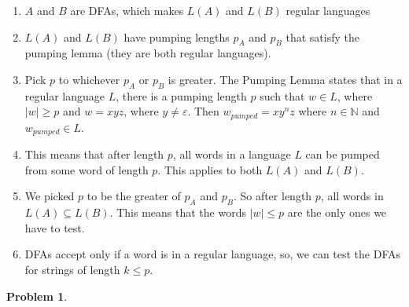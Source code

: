 \documentclass[11pt]{article}
\newcommand{\N}{\mathbb{N}}
\theoremstyle{definition}
\theoremstyle{case}
\theoremstyle{theorem}
\newtheorem{prob}{Problem}
\begin{document}
\begin{enumerate}[label=\arabic*.]

\item $A$ and $B$ are DFAs, which makes $L(A)$ and $L(B)$ regular languages

\item $L(A)$ and $L(B)$ have pumping lengths $p_A$ and $p_B$ that satisfy the pumping lemma
(they are both regular languages).

\item Pick $p$ to whichever $p_A$ or $p_B$ is greater. The Pumping Lemma states that
in a regular language $L$, there is a pumping length $p$ such that $w \in L$, where $|w| \geq p$ 
and $w = xyz$, where $y \neq \varepsilon$. Then $w_{pumped} = xy^nz$ where $n \in \N$ and 
$w_{pumped} \in L$. 

\item This means that after length $p$, all words in a language $L$ can be pumped from some word of length $p$.
This applies to both $L(A)$ and $L(B)$.

\item We picked $p$ to be the greater of $p_A$ and $p_B$. So after length $p$, 
all words in $L(A) \subseteq L(B)$. This means that the words $|w| \leq p$ are
the only ones we have to test.

\item DFAs accept only if a word is in a regular language, so, we can test the DFAs 
for strings of length $k \leq p$.

\end{enumerate}

\begin{prob}\end{prob}
\end{document}
